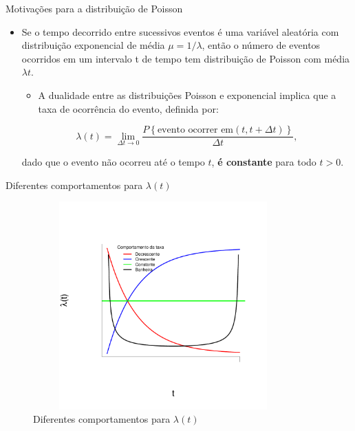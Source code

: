 \documentclass[10pt, aspectratio=169]{beamer}
\begin{document}
\begin{frame}{Motivações para a distribuição de Poisson}

\begin{itemize}
    

        \item Se o tempo decorrido entre sucessivos eventos é uma variável aleatória com distribuição exponencial de média $\mu=1/\lambda$, então o número de eventos ocorridos em um intervalo t de tempo tem distribuição de Poisson com média $\lambda t$.
        
         \vspace{0,3cm}
         
\begin{itemize}    
        
        \item A dualidade entre as distribuições Poisson e exponencial implica que a taxa de ocorrência do evento, definida por:
        
        
\end{itemize}

    
$$
    \lambda (t) =\lim_{\Delta t\rightarrow 0}\frac{P\left \{ \text{evento ocorrer em} \left ( t,t+\Delta t \right ) \right \}}{\Delta t},
$$  

     \vspace{0,3cm}
     
dado que o evento não ocorreu até o tempo $t$, \textbf{é constante} para todo $t>0$.

        
         \end{itemize}
    
\end{frame}   




\begin{frame}{Diferentes comportamentos para $\lambda (t)$}
    \vspace{-1.5cm}
    \begin{figure}[h]
    \includegraphics[height=8cm,width=10cm]{images/Graf_Risco.pdf}
    \vspace{-0.8cm}
    \caption{Diferentes comportamentos para $\lambda (t)$}
    \label{Fig1}
    \centering
    
\end{figure}
\end{frame}
\end{document}
